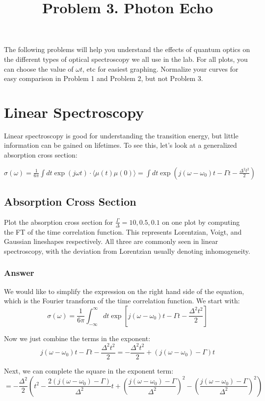 \documentclass[12pt]{article}
\title{Problem 3. Photon Echo }
\author{}
\date{}
\begin{document}
\maketitle
The following problems will help you understand the effects of quantum optics on the different types of optical spectroscopy we all use in the lab. For all plots, you can choose the value of $\omega t$, etc for easiest graphing. Normalize your curves for easy comparison in Problem 1 and Problem 2, but not Problem 3.

\section{Linear Spectroscopy}

Linear spectroscopy is good for understanding the transition energy, but little information can be gained on lifetimes. To see this, let's look at a generalized absorption cross section:

$\sigma(\omega)=\frac{1}{6 \pi} \int d t \exp (j \omega t) \cdot\langle\mu(t) \mu(0)\rangle=\int d t \exp \left(j\left(\omega-\omega_{0}\right) t-\Gamma t-\frac{\Delta^{2} t^{2}}{2}\right)$
\subsection{Absorption Cross Section}
 Plot the absorption cross section for $\frac{\Gamma}{\Delta}=10,0.5,0.1$ on one plot by computing the FT of the time correlation function. This represents Lorentzian, Voigt, and Gaussian lineshapes respectively. All three are commonly seen in linear spectroscopy, with the deviation from Lorentzian usually denoting inhomogeneity.
\subsubsection{Answer}
We would like to simplify the  expression on the right hand side of the equation, which is the Fourier transform of the time correlation function. We start with:
\begin{equation}
  \sigma(\omega) = \frac{1}{6 \pi} \int_{-\infty}^{\infty} dt \exp \left[j(\omega - \omega_0)t - \Gamma t - \frac{\Delta^2 t^2}{2}\right]
\end{equation}


   Now we just combine the terms in the exponent:
   \[
   j(\omega - \omega_0)t - \Gamma t - \frac{\Delta^2 t^2}{2} = - \frac{\Delta^2 t^2}{2} + (j(\omega - \omega_0) - \Gamma) t
   \]

Next, we can complete the square in the exponent term:
\begin{equation}
  = -\frac{\Delta^2}{2} \left(t^2 - \frac{2(j(\omega - \omega_0) - \Gamma)}{\Delta^2}t+ \left(\frac{j(\omega - \omega_0) - \Gamma}{\Delta^2}\right)^2 - \left(\frac{j(\omega - \omega_0) - \Gamma}{\Delta^2}\right)^2\right)
\end{equation}
\end{document}

